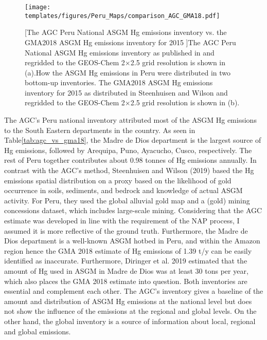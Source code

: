 \begin{figure}[H]
\centering
  \texttt{[image: templates/figures/Peru\_Maps/comparison\_AGC\_GMA18.pdf]}  

[The AGC Peru National ASGM Hg emissions inventory vs. the GMA2018 ASGM Hg emissions inventory for 2015 ]{The AGC Peru National ASGM Hg emissions inventory as published in \cite{agc_reporte_2017} and regridded to the GEOS-Chem 2$\times$2.5 grid resolution is shown in (a).How the ASGM Hg emissions in Peru were distributed in two bottom-up inventories. The GMA2018 ASGM Hg emissions inventory for 2015 as distributed in Steenhuisen and Wilson \cite{steenhuisen_development_2019} and regridded  to the GEOS-Chem 2$\times$2.5 grid resolution is shown in (b).}
\label{fig:agc_vs_gma18}
\end{figure}
\FloatBarrier
\begin{flushleft}
The AGC's Peru national inventory attributed most of the ASGM Hg emissions to the South Eastern departments in the country\cite{agc_reporte_2017}. As seen in Table\ref{tab:agc_vs_gma18}, the Madre de Dios department is the largest source of Hg emissions, followed by Arequipa, Puno, Ayacucho, Cusco, respectively. The rest of Peru together contributes about 0.98 tonnes of Hg emissions annually. In contrast with the AGC's method, Steenhuisen and Wilson (2019) based the Hg emissions spatial distribution on a proxy based on the likelihood of gold occurrence in soils, sediments, and bedrock and knowledge of actual ASGM activity. For Peru, they used the global alluvial gold map and a (gold) mining concessions dataset, which includes large-scale mining. Considering that the AGC estimate was developed in line with the requirement of the NAP process, I assumed it is more reflective of the ground truth. Furthermore, the Madre de Dios department is a well-known ASGM hotbed in Peru, and within the Amazon region hence the GMA 2018 estimate of Hg emissions of 1.39 t/y can be easily identified as inaccurate. Furthermore, Diringer et al. 2019 estimated that the amount of Hg used in ASGM in Madre de Dios was at least 30 tons per year, which also places the GMA 2018 estimate into question\cite{diringer_deforestation_2019}. Both inventories are essential and complement each other. The AGC's inventory gives a baseline of the amount and distribution of ASGM Hg emissions at the national level but does not show the influence of the emissions at the regional and global levels. On the other hand, the global inventory is a source of information about local, regional and global emissions. 
\end{flushleft}
